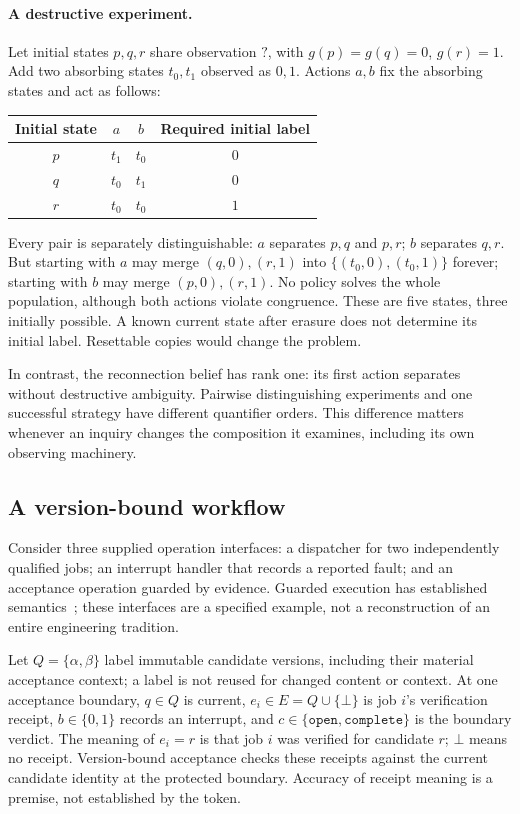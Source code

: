 \documentclass[11pt]{article}
\begin{document}
\paragraph{A destructive experiment.}\label{par:destructive}
Let initial states $p,q,r$ share observation $?$, with $g(p)=g(q)=0$, $g(r)=1$. Add two absorbing states $t_0,t_1$ observed as $0,1$. Actions $a,b$ fix the absorbing states and act as follows:
\begin{center}
\begin{tabular}{c@{\qquad}cc@{\qquad}c}
\toprule Initial state & $a$ & $b$ & Required initial label\\\midrule
$p$ & $t_1$ & $t_0$ & $0$\\
$q$ & $t_0$ & $t_1$ & $0$\\
$r$ & $t_0$ & $t_0$ & $1$\\\bottomrule
\end{tabular}
\end{center}
Every pair is separately distinguishable: $a$ separates $p,q$ and $p,r$; $b$ separates $q,r$. But starting with $a$ may merge $(q,0),(r,1)$ into $\{(t_0,0),(t_0,1)\}$ forever; starting with $b$ may merge $(p,0),(r,1)$. No policy solves the whole population, although both actions violate congruence. These are five states, three initially possible. A known current state after erasure does not determine its initial label. Resettable copies would change the problem.

In contrast, the reconnection belief has rank one: its first action separates without destructive ambiguity. Pairwise distinguishing experiments and one successful strategy have different quantifier orders. This difference matters whenever an inquiry changes the composition it examines, including its own observing machinery.

\subsection{A version-bound workflow}\label{sec:workflow}
Consider three supplied operation interfaces: a dispatcher for two independently qualified jobs; an interrupt handler that records a reported fault; and an acceptance operation guarded by evidence. Guarded execution has established semantics~\cite{dijkstra}; these interfaces are a specified example, not a reconstruction of an entire engineering tradition.

Let $Q=\{\alpha,\beta\}$ label immutable candidate versions, including their material acceptance context; a label is not reused for changed content or context. At one acceptance boundary, $q\in Q$ is current, $e_i\in E=Q\cup\{\bot\}$ is job $i$'s verification receipt, $b\in\{0,1\}$ records an interrupt, and $c\in\{\mathtt{open},\mathtt{complete}\}$ is the boundary verdict. The meaning of $e_i=r$ is that job $i$ was verified for candidate $r$; $\bot$ means no receipt. Version-bound acceptance checks these receipts against the current candidate identity at the protected boundary. Accuracy of receipt meaning is a premise, not established by the token.
\end{document}
